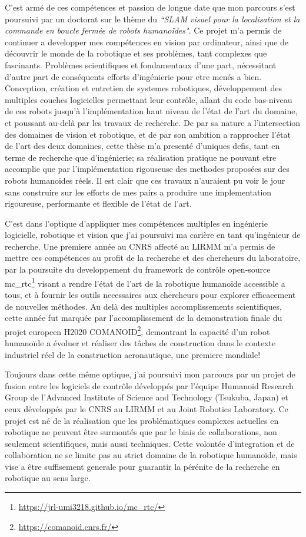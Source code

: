 \documentclass[11pt, a4paper]{awesome-cv}
\begin{document}
\begin{cvletter}
  C'est armé de ces compétences et passion de longue date que mon parcours s'est poursuivi par un doctorat sur le thème du \emph{``SLAM visuel pour la localisation et la commande en boucle fermée de robots humanoïdes"}. Ce projet m'a permis de continuer a developper mes compétences en vision par ordinateur, ainsi que de découvrir le monde de la robotique et ses problèmes, tant complexes que fascinants. Problèmes scientifiques et fondamentaux d'une part, nécessitant d'autre part de conséquents efforts d'ingénierie pour etre menés a bien. Conception, création et entretien de systemes robotiques, développement des multiples couches logicielles permettant leur contrôle, allant du code bas-niveau de ces robots jusqu'à l'implémentation haut niveau de l'état de l'art du domaine, et poussant au-delà par les travaux de recherche. De par sa nature a l'intersection des domaines de vision et robotique, et de par son ambition a rapprocher l'état de l'art des deux domaines, cette thèse m'a presenté d'uniques defis, tant en terme de recherche que d'ingénierie; sa réalisation pratique ne pouvant etre accomplie que par l'implémentation rigouseuse des methodes proposées sur des robots humanoïdes réels. Il est clair que ces travaux n'auraient pu voir le jour sans construire sur les efforts de mes pairs a produire une implementation rigoureuse, performante et flexible de l'état de l'art.

  C'est dans l'optique d'appliquer mes compétences multiples en ingénierie logicielle, robotique et vision que j'ai poursuivi ma carière en tant qu'ingénieur de recherche. Une premiere année au CNRS affecté au LIRMM m'a permis de mettre ces compétences au profit de la recherche et des chercheurs du laboratoire, par la poursuite du developpement du framework de contrôle open-source mc\_rtc\footnote{\url{https://jrl-umi3218.github.io/mc_rtc/}} visant a rendre l'état de l'art de la robotique humanoïde accessible a tous, et à fournir les outils necessaires aux chercheurs pour explorer efficacement de nouvelles méthodes. Au delà des multiples accomplissements scientifiques, cette année fut marquée par l'accomplissement de la demonstration finale du projet europeen H2020 COMANOID\footnote{\url{https://comanoid.cnrs.fr/}}, demontrant la capacité d'un robot humanoïde a évoluer et réaliser des tâches de construction dans le contexte industriel réel de la construction aeronautique, une premiere mondiale!

  Toujours dans cette même optique, j'ai poursuivi mon parcours par un projet de fusion entre les logiciels de contrôle développés par l'équipe Humanoid Research Group de l'Advanced Institute of Science and Technology (Tsukuba, Japan) et ceux développés par le CNRS au LIRMM et au Joint Robotics Laboratory. Ce projet est né de la réalisation que les problématiques complexes actuelles en robotique ne peuvent être surmontés que par le biais de collaborations, non seulement scientifiques, mais aussi techniques. Cette volontée d'integration et de collaboration ne se limite pas au strict domaine de la robotique humanoïde, mais vise a être suffisement generale pour guarantir la pérénite de la recherche en robotique au sens large.


\end{cvletter}
\end{document}

